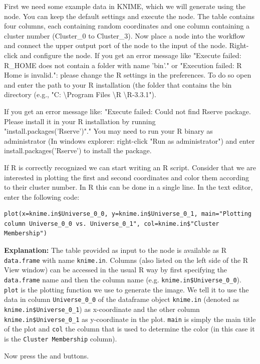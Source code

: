 \begin{task}
First we need some example data in KNIME, which we will generate using the  node. You can 
keep the default settings and execute the node. The table contains four columns, each containing random coordinates 
and one column containing a cluster number (Cluster\_0 to Cluster\_3). Now place a  node 
into the workflow and connect the upper output port of the  node to the input of the 
 node. Right-click and configure the node.
If you get an error message like "Execute failed: R\_HOME does not contain a folder with name 'bin'." or "Execution 
failed: R Home is invalid.": please change the R settings in the preferences. To do so open  and enter the path to your R installation (the folder that contains the bin directory (e.g., "C: 
\textbackslash Program Files \textbackslash R \textbackslash R-3.3.1").

If you get an error message like:
"Execute failed: Could not find Rserve package. Please install it in your R installation by running \\ 
"install.packages('Rserve')"." You may need to run your R binary as administrator (In windows explorer: right-click 
"Run as administrator") and enter install.packages('Rserve') to install the package.

If R is correctly recognized we can start writing an R script. Consider that we are interested in plotting the first 
and second coordinates and color them according to their cluster number. In R this can be done in a single line.
In the  text editor, enter the following code:
\begin{lstlisting}
plot(x=knime.in$Universe_0_0, y=knime.in$Universe_0_1, main="Plotting column Universe_0_0 vs. Universe_0_1", col=knime.in$"Cluster Membership")
\end{lstlisting}
        
\textbf{Explanation:}
The table provided as input to the  node is available as R \texttt{data.frame} with name 
\texttt{knime.in}. Columns (also listed on the left side of the R View window) can be accessed in the usual R way by 
first specifying the \texttt{data.frame} name and then the column name (e.g. \texttt{knime.in\$Universe\_0\_0}).
\texttt{plot} is the plotting function we use to generate the image. We tell it to use the data in column 
\texttt{Universe\_0\_0} of the dataframe object \texttt{knime.in} (denoted as \texttt{knime.in\$Universe\_0\_1}) as 
x-coordinate and the other column \texttt{knime.in\$Universe\_0\_1} as y-coordinate in the plot. \texttt{main} is 
simply the main title of the plot and \texttt{col} the column that is used to determine the color (in this case it is 
the \texttt{Cluster Membership} column).

Now press the  and  buttons.
\end{task}

